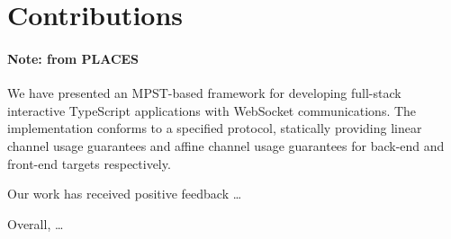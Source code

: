 \section{Contributions}

\paragraph{Note: from PLACES}

We have presented an MPST-based framework for developing full-stack interactive
TypeScript applications with WebSocket communications.
The implementation conforms to a specified
protocol, statically providing linear channel usage guarantees and affine
channel usage guarantees for back-end and front-end targets respectively.

Our work has received positive feedback \dots

Overall, \dots

